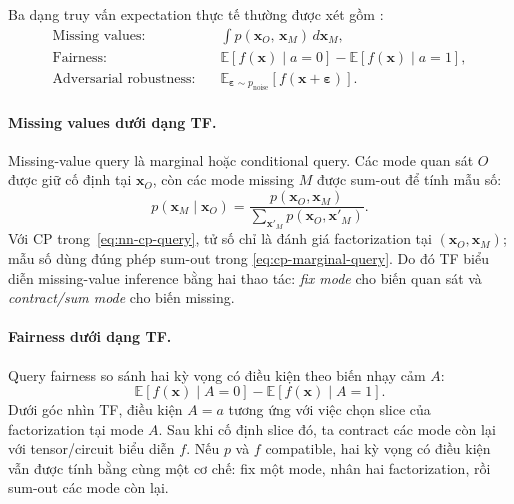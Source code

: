 Ba dạng truy vấn expectation thực tế thường được xét gồm
\cite{chrysos2025foundationsTutorial}:
\begin{align}
    \text{Missing values:}\quad &
    \int p(\mathbf{x}_O,\, \mathbf{x}_M)\, d\mathbf{x}_M,\\
    \text{Fairness:}\quad &
    \mathbb{E}[f(\mathbf{x}) \mid a=0] - \mathbb{E}[f(\mathbf{x}) \mid a=1],\\
    \text{Adversarial robustness:}\quad &
    \mathbb{E}_{\boldsymbol{\varepsilon} \sim p_{\mathrm{noise}}}
    [f(\mathbf{x} + \boldsymbol{\varepsilon})].
\end{align}

\paragraph{Missing values dưới dạng TF.}
Missing-value query là marginal hoặc conditional query.  Các mode quan sát $O$ được
giữ cố định tại $\mathbf{x}_O$, còn các mode missing $M$ được sum-out để tính mẫu số:
\begin{equation}
    p(\mathbf{x}_M\mid \mathbf{x}_O)
    =
    \frac{p(\mathbf{x}_O,\mathbf{x}_M)}
         {\sum_{\mathbf{x}'_M}p(\mathbf{x}_O,\mathbf{x}'_M)}.
    \label{eq:missing-conditional}
\end{equation}
Với CP trong~\eqref{eq:nn-cp-query}, tử số chỉ là đánh giá factorization tại
$(\mathbf{x}_O,\mathbf{x}_M)$; mẫu số dùng đúng phép sum-out trong
\eqref{eq:cp-marginal-query}.  Do đó TF biểu diễn missing-value inference bằng hai
thao tác: \emph{fix mode} cho biến quan sát và \emph{contract/sum mode} cho biến
missing.

\paragraph{Fairness dưới dạng TF.}
Query fairness so sánh hai kỳ vọng có điều kiện theo biến nhạy cảm
$A$:
\begin{equation}
    \mathbb{E}[f(\mathbf{x})\mid A=0]
    -
    \mathbb{E}[f(\mathbf{x})\mid A=1].
\end{equation}
Dưới góc nhìn TF, điều kiện $A=a$ tương ứng với việc chọn slice của factorization tại
mode $A$.  Sau khi cố định slice đó, ta contract các mode còn lại với tensor/circuit
biểu diễn $f$.  Nếu $p$ và $f$ compatible, hai kỳ vọng có điều kiện vẫn được tính bằng
cùng một cơ chế: fix một mode, nhân hai factorization, rồi sum-out các mode còn lại.

